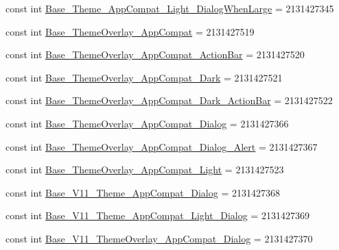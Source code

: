 \begin{DoxyCompactItemize}
\item 
const int \mbox{\hyperlink{class_f_w_p_s___app_1_1_droid_1_1_resource_1_1_style_a96714a4c34d3eeccb37885c0ce6dd913}{Base\+\_\+\+Theme\+\_\+\+App\+Compat\+\_\+\+Light\+\_\+\+Dialog\+When\+Large}} = 2131427345
\item 
const int \mbox{\hyperlink{class_f_w_p_s___app_1_1_droid_1_1_resource_1_1_style_a024d55c4d8cf6b0a5f8830bf490b40d1}{Base\+\_\+\+Theme\+Overlay\+\_\+\+App\+Compat}} = 2131427519
\item 
const int \mbox{\hyperlink{class_f_w_p_s___app_1_1_droid_1_1_resource_1_1_style_ab01506b5a027763e3c7314480e877d24}{Base\+\_\+\+Theme\+Overlay\+\_\+\+App\+Compat\+\_\+\+Action\+Bar}} = 2131427520
\item 
const int \mbox{\hyperlink{class_f_w_p_s___app_1_1_droid_1_1_resource_1_1_style_a5bc1b48bc41635f7843343a89a8268b0}{Base\+\_\+\+Theme\+Overlay\+\_\+\+App\+Compat\+\_\+\+Dark}} = 2131427521
\item 
const int \mbox{\hyperlink{class_f_w_p_s___app_1_1_droid_1_1_resource_1_1_style_ae09c8aa64764e0392be1b30a4d9da769}{Base\+\_\+\+Theme\+Overlay\+\_\+\+App\+Compat\+\_\+\+Dark\+\_\+\+Action\+Bar}} = 2131427522
\item 
const int \mbox{\hyperlink{class_f_w_p_s___app_1_1_droid_1_1_resource_1_1_style_a4c34acb794867eea0ee2b97fbf99bf99}{Base\+\_\+\+Theme\+Overlay\+\_\+\+App\+Compat\+\_\+\+Dialog}} = 2131427366
\item 
const int \mbox{\hyperlink{class_f_w_p_s___app_1_1_droid_1_1_resource_1_1_style_a3476e928a9b359cc350744a1ff885c60}{Base\+\_\+\+Theme\+Overlay\+\_\+\+App\+Compat\+\_\+\+Dialog\+\_\+\+Alert}} = 2131427367
\item 
const int \mbox{\hyperlink{class_f_w_p_s___app_1_1_droid_1_1_resource_1_1_style_a44531a208a93a5857635b0306e3f824e}{Base\+\_\+\+Theme\+Overlay\+\_\+\+App\+Compat\+\_\+\+Light}} = 2131427523
\item 
const int \mbox{\hyperlink{class_f_w_p_s___app_1_1_droid_1_1_resource_1_1_style_ae694945de4ef85c0c77880131c5bc1ef}{Base\+\_\+\+V11\+\_\+\+Theme\+\_\+\+App\+Compat\+\_\+\+Dialog}} = 2131427368
\item 
const int \mbox{\hyperlink{class_f_w_p_s___app_1_1_droid_1_1_resource_1_1_style_aa810ec7435c1ad71ca442b56368c7968}{Base\+\_\+\+V11\+\_\+\+Theme\+\_\+\+App\+Compat\+\_\+\+Light\+\_\+\+Dialog}} = 2131427369
\item 
const int \mbox{\hyperlink{class_f_w_p_s___app_1_1_droid_1_1_resource_1_1_style_a43893e853f2c48d20989507a5e11225a}{Base\+\_\+\+V11\+\_\+\+Theme\+Overlay\+\_\+\+App\+Compat\+\_\+\+Dialog}} = 2131427370

\end{DoxyCompactItemize}

